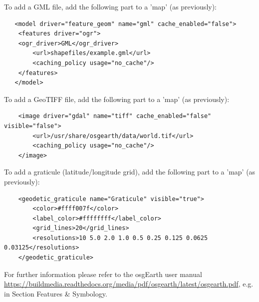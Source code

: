 To add a GML file, add the following part to a 'map' (as previously):

\begin{lstlisting}
   <model driver="feature_geom" name="gml" cache_enabled="false">
    <features driver="ogr">
	<ogr_driver>GML</ogr_driver>
        <url>shapefiles/example.gml</url>
        <caching_policy usage="no_cache"/>
    </features>
   </model>
\end{lstlisting}

To add a GeoTIFF file, add the following part to a 'map' (as previously):

\begin{lstlisting}
    <image driver="gdal" name="tiff" cache_enabled="false" visible="false">
        <url>/usr/share/osgearth/data/world.tif</url>
        <caching_policy usage="no_cache"/>
    </image>
\end{lstlisting}

To add a graticule (latitude/longitude grid), add the following part to a 'map' (as previously):

\begin{lstlisting}
    <geodetic_graticule name="Graticule" visible="true">
        <color>#ffff007f</color>
        <label_color>#ffffffff</label_color>
        <grid_lines>20</grid_lines>
        <resolutions>10 5.0 2.0 1.0 0.5 0.25 0.125 0.0625 0.03125</resolutions>
    </geodetic_graticule>
\end{lstlisting}


For further information please refer to the osgEarth user manual \url{https://buildmedia.readthedocs.org/media/pdf/osgearth/latest/osgearth.pdf}, e.g. in Section Features \& Symbology.
